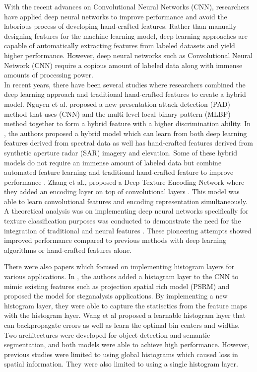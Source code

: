 \documentclass[10pt,twocolumn,letterpaper]{article}
\begin{document}
 With the recent advances on Convolutional Neural Networks (CNN), researchers have applied deep neural networks to improve performance and avoid the laborious process of developing hand-crafted features. Rather than manually designing features for the machine learning model, deep learning approaches are capable of automatically extracting features from labeled datasets and yield higher performance. However, deep neural networks such as Convolutional Neural Network (CNN) require a copious amount of labeled data along with immense amounts of processing power. 
\\


In recent years, there have been several studies where researchers combined the deep learning approach and traditional hand-crafted features to create a hybrid model. 
Nguyen et al. \cite{Nguyen2018Face} proposed a new presentation attack detection (PAD) method that uses (CNN)  and the multi-level local binary pattern (MLBP) method together to form a hybrid feature with a higher discrimination ability. In \cite{Nijhawan2019snowmap}, the authors proposed a hybrid model which can learn from both deep learning features derived from spectral data as well has hand-crafted features derived from synthetic aperture radar (SAR) imagery and elevation. Some of these hybrid models do not require an immense amount of labeled data but combine automated feature learning and traditional hand-crafted feature to improve performance \cite{Nijhawan2019snowmap}. 
Zhang et al., proposed a Deep Texture Encoding Network where they added an encoding layer on top of convolutional layers \cite{Zhang2016ten}. This model was able to learn convolutional features and encoding representation simultaneously. A theoretical analysis was on implementing deep neural networks specifically for texture classification purposes was conducted to demonstrate the need for the integration of traditional and neural features \cite{Basu2018deeptexture}. These pioneering attempts showed improved performance compared to previous methods with deep learning algorithms or hand-crafted features alone. 

There were also papers which focused on implementing histogram layers for various applications. 
In \cite{Sedighi2017steg}, the authors added a histogram layer to the CNN to mimic existing features such as projection spatial rich model (PSRM) and proposed the model for steganalysis applications. By implementing a new histogram layer, they were able to capture the statisctics from the feature maps with the histogram layer. Wang et al \cite{Wang2018learnable} proposed a learnable histogram layer that can backpropagate errors as well as learn the optimal bin centers and widths. Two architectures were developed for object detection and semantic segmentation, and both models were able to achieve high performance.
However, previous studies were limited to using global histograms which caused loss in spatial information. They were also limited to using a single histogram layer.
\end{document}
